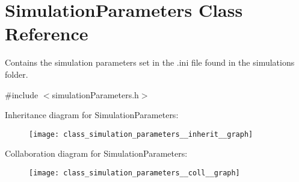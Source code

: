 \hypertarget{class_simulation_parameters}{}\section{Simulation\+Parameters Class Reference}
\label{class_simulation_parameters}


Contains the simulation parameters set in the .ini file found in the simulations folder.  




{\ttfamily \#include $<$simulation\+Parameters.\+h$>$}



Inheritance diagram for Simulation\+Parameters\+:
\nopagebreak
\begin{figure}[H]
\begin{center}
\leavevmode
\texttt{[image: class\_simulation\_parameters\_\_inherit\_\_graph]}
\end{center}
\end{figure}


Collaboration diagram for Simulation\+Parameters\+:
\nopagebreak
\begin{figure}[H]
\begin{center}
\leavevmode
\texttt{[image: class\_simulation\_parameters\_\_coll\_\_graph]}
\end{center}
\end{figure}
